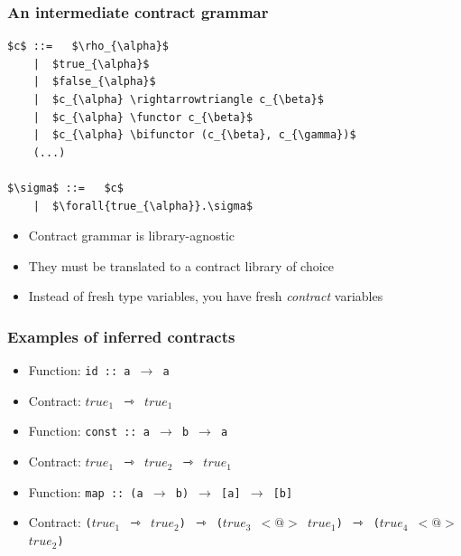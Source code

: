 \documentclass[]{beamer}
\makeatletter
\newcommand{\functor}{<\!\!\!@\!\!\!>}
\newcommand{\bifunctor}{<\!\!\!@\!\!@\!\!\!>}
\makeatother
\begin{document}
\begin{frame}[fragile]
\frametitle{An intermediate contract grammar}

\begin{lstlisting}[mathescape]
$c$ ::=   $\rho_{\alpha}$
    |  $true_{\alpha}$
    |  $false_{\alpha}$
    |  $c_{\alpha} \rightarrowtriangle c_{\beta}$
    |  $c_{\alpha} \functor c_{\beta}$
    |  $c_{\alpha} \bifunctor (c_{\beta}, c_{\gamma})$
    (...)
    
$\sigma$ ::=   $c$
    |  $\forall{true_{\alpha}}.\sigma$
\end{lstlisting}

\begin{itemize}
	\item Contract grammar is library-agnostic
	\item They must be translated to a contract library of choice
	\item Instead of fresh type variables, you have fresh \textit{contract} variables
\end{itemize}

\end{frame}

\begin{frame}[fragile]
\frametitle{Examples of inferred contracts}

\begin{itemize}
	\item Function: \texttt{id :: a $\rightarrow$ a}
	\item Contract: \texttt{$true_1$ $\rightarrowtriangle$ $true_1$}
\end{itemize}

\begin{itemize}
	\item Function: \texttt{const :: a $\rightarrow$ b $\rightarrow$ a}
	\item Contract: \texttt{$true_1$ $\rightarrowtriangle$ $true_2$ $\rightarrowtriangle$ $true_1$}
\end{itemize}

\begin{itemize}
	\item Function: \texttt{map :: (a $\rightarrow$ b) $\rightarrow$ [a] $\rightarrow$ [b]}
	\item Contract: \texttt{($true_1$ $\rightarrowtriangle$ $true_2$) $\rightarrowtriangle$ ($true_3$ $\functor$ $true_1$) $\rightarrowtriangle$ ($true_4$ $\functor$ $true_2$)}
\end{itemize}

\end{frame}
\end{document}
